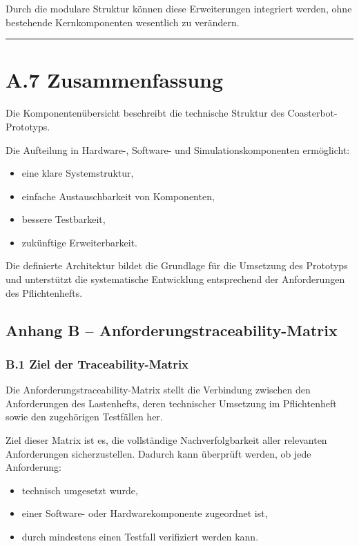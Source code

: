 \documentclass[
]{article}
\providecommand{\tightlist}{%
  \setlength{\itemsep}{0pt}\setlength{\parskip}{0pt}}
\begin{document}
Durch die modulare Struktur können diese Erweiterungen integriert
werden, ohne bestehende Kernkomponenten wesentlich zu verändern.

\begin{center}\rule{0.5\linewidth}{0.5pt}\end{center}

\section{A.7 Zusammenfassung}\label{a.7-zusammenfassung}

Die Komponentenübersicht beschreibt die technische Struktur des
Coasterbot-Prototyps.

Die Aufteilung in Hardware-, Software- und Simulationskomponenten
ermöglicht:

\begin{itemize}
\tightlist
\item
  eine klare Systemstruktur,
\item
  einfache Austauschbarkeit von Komponenten,
\item
  bessere Testbarkeit,
\item
  zukünftige Erweiterbarkeit.
\end{itemize}

Die definierte Architektur bildet die Grundlage für die Umsetzung des
Prototyps und unterstützt die systematische Entwicklung entsprechend der
Anforderungen des Pflichtenhefts.

\subsection{Anhang B --
Anforderungstraceability-Matrix}\label{anhang-b-anforderungstraceability-matrix}

\subsubsection{B.1 Ziel der
Traceability-Matrix}\label{b.1-ziel-der-traceability-matrix}

Die Anforderungstraceability-Matrix stellt die Verbindung zwischen den
Anforderungen des Lastenhefts, deren technischer Umsetzung im
Pflichtenheft sowie den zugehörigen Testfällen her.

Ziel dieser Matrix ist es, die vollständige Nachverfolgbarkeit aller
relevanten Anforderungen sicherzustellen. Dadurch kann überprüft werden,
ob jede Anforderung:

\begin{itemize}
\tightlist
\item
  technisch umgesetzt wurde,
\item
  einer Software- oder Hardwarekomponente zugeordnet ist,
\item
  durch mindestens einen Testfall verifiziert werden kann.
\end{itemize}
\end{document}
